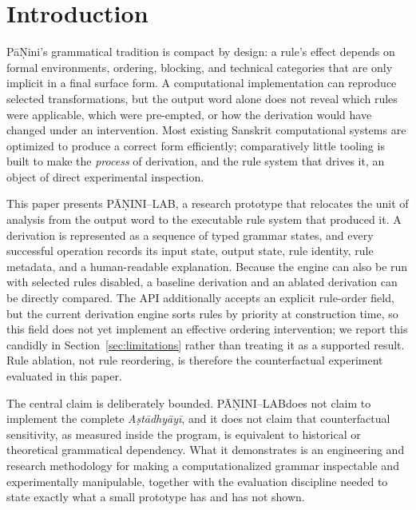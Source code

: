 \documentclass[conference]{IEEEtran}
\newcommand{\system}{P\={A}\d{N}INI--LAB}
\begin{document}
\section{Introduction}
P\={a}\d{N}ini's grammatical tradition is compact by design: a rule's effect depends on formal environments, ordering, blocking, and technical categories that are only implicit in a final surface form. A computational implementation can reproduce selected transformations, but the output word alone does not reveal which rules were applicable, which were pre-empted, or how the derivation would have changed under an intervention. Most existing Sanskrit computational systems are optimized to produce a correct form efficiently; comparatively little tooling is built to make the \emph{process} of derivation, and the rule system that drives it, an object of direct experimental inspection.

This paper presents \system, a research prototype that relocates the unit of analysis from the output word to the executable rule system that produced it. A derivation is represented as a sequence of typed grammar states, and every successful operation records its input state, output state, rule identity, rule metadata, and a human-readable explanation. Because the engine can also be run with selected rules disabled, a baseline derivation and an ablated derivation can be directly compared. The API additionally accepts an explicit rule-order field, but the current derivation engine sorts rules by priority at construction time, so this field does not yet implement an effective ordering intervention; we report this candidly in Section~\ref{sec:limitations} rather than treating it as a supported result. Rule ablation, not rule reordering, is therefore the counterfactual experiment evaluated in this paper.

The central claim is deliberately bounded. \system does not claim to implement the complete \textit{A\d{s}t\=adhy\=ay\=i}, and it does not claim that counterfactual sensitivity, as measured inside the program, is equivalent to historical or theoretical grammatical dependency. What it demonstrates is an engineering and research methodology for making a computationalized grammar inspectable and experimentally manipulable, together with the evaluation discipline needed to state exactly what a small prototype has and has not shown.
\end{document}
